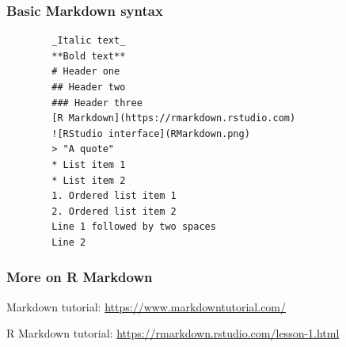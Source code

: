 \documentclass{beamer}
\begin{document}
	\begin{frame}[fragile]
		\frametitle{Basic Markdown syntax}

		\begin{exampleblock}{}
		\begin{BVerbatim}
		_Italic text_
		**Bold text**
		# Header one
		## Header two
		### Header three
		[R Markdown](https://rmarkdown.rstudio.com)
		![RStudio interface](RMarkdown.png)
		> "A quote"
		* List item 1
		* List item 2
		1. Ordered list item 1
		2. Ordered list item 2
		Line 1 followed by two spaces  
		Line 2 
		\end{BVerbatim}
		\end{exampleblock}{}

	\end{frame}

	\begin{frame}
		\frametitle{More on R Markdown}

		Markdown tutorial: \href{https://www.markdowntutorial.com/}{https://www.markdowntutorial.com/}

		\vspace{1em}
		
		R Markdown tutorial: \href{https://rmarkdown.rstudio.com/lesson-1.html}{https://rmarkdown.rstudio.com/lesson-1.html}

	\end{frame}
\end{document}
